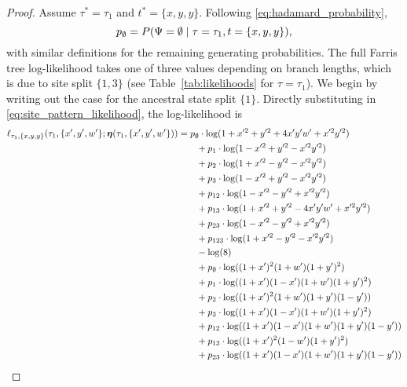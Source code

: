 \begin{proof}
Assume $\tau^*=\tau_1$ and $t^*=\{x,y,y\}$.
Following \eqref{eq:hadamard_probability},
$$
p_{\emptyset} = P(\Psi=\emptyset \mid \tau=\tau_1,t=\{x,y,y\}),
$$
with similar definitions for the remaining generating probabilities.
The full Farris tree log-likelihood takes one of three values depending on branch lengths, which is due to site split $\{1,3\}$ (see Table~\ref{tab:likelihoods} for $\tau = \tau_1$).
We begin by writing out the case for the ancestral state split $\{1\}$.
Directly substituting in \eqref{eq:site_pattern_likelihood}, the log-likelihood is
\begin{align}
    \label{eq:farris_likelihood}
    \ell_{\tau_1,\{x,y,y\}}(\tau_1, \{x',y',w'\}; \fullAncestralSplitPartitions(\tau_1,\{x',y',w'\}))
    &=        p_{\emptyset}  \cdot\log(1+x'^2+y'^2+4x'y'w'+x'^2y'^2) \nonumber \\
    &\qquad + p_{1}          \cdot\log(1-x'^2+y'^2-x'^2y'^2) \nonumber \\
    &\qquad + p_{2}          \cdot\log(1+x'^2-y'^2-x'^2y'^2) \nonumber \\
    &\qquad + p_{3}          \cdot\log(1-x'^2+y'^2-x'^2y'^2) \nonumber \\
    &\qquad + p_{12}         \cdot\log(1-x'^2-y'^2+x'^2y'^2) \nonumber \\
    &\qquad + p_{13}         \cdot\log(1+x'^2+y'^2-4x'y'w'+x'^2y'^2) \nonumber \\
    &\qquad + p_{23}         \cdot\log(1-x'^2-y'^2+x'^2y'^2) \nonumber \\
    &\qquad + p_{123}        \cdot\log(1+x'^2-y'^2-x'^2y'^2) \nonumber \\
    &\qquad - \log(8) \nonumber \\
    &\qquad + p_{\emptyset}  \cdot\log((1+x')^2   (1+w')(1+y')^2) \nonumber \\
    &\qquad + p_{1}          \cdot\log((1+x')(1-x')(1+w')(1+y')^2) \nonumber \\
    &\qquad + p_{2}          \cdot\log((1+x')^2   (1+w')(1+y')(1-y')) \nonumber \\
    &\qquad + p_{3}          \cdot\log((1+x')(1-x')(1+w')(1+y')^2) \nonumber \\
    &\qquad + p_{12}         \cdot\log((1+x')(1-x')(1+w')(1+y')(1-y')) \nonumber \\
    &\qquad + p_{13}         \cdot\log((1+x')^2   (1-w')(1+y')^2) \nonumber \\
    &\qquad + p_{23}         \cdot\log((1+x')(1-x')(1+w')(1+y')(1-y')) \nonumber \\

\end{align}
\end{proof}
